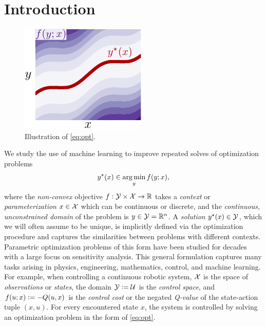 \documentclass[twoside,11pt]{article}
\begin{document}
\section{Introduction}
\begin{figure}
\vspace{-4mm}
\includegraphics[width=\linewidth]{fig/opt.pdf}\vspace{-2mm}
\caption{Illustration of \cref{eq:opt}.}
\vspace{-2mm}
\end{figure}
We study the use of machine learning
to improve repeated solves of optimization problems
\begin{equation}
  y^\star(x) \in \operatorname*{arg\,min}_y f(y; x),
  \label{eq:opt}
\end{equation}
where the \emph{non-convex} objective
$f: {\mathcal{Y}}\times {\mathcal{X}}\rightarrow \mathbb{R}$
takes a \emph{context} or \emph{parameterization}
$x\in{\mathcal{X}}$ which can be continuous or discrete,
and the \emph{continuous, unconstrained domain} of
the problem is $y\in{\mathcal{Y}}=\mathbb{R}^n$.
A \emph{solution} $y^\star(x)\in{\mathcal{Y}}$, which we will often
assume to be unique, is implicitly defined via
the optimization procedure and captures the similarities
between problems with different contexts.
Parametric optimization problems of this form
have been studied for decades
\citep{bank1982non,fiacco1990sensitivity,shapiro2003sensitivity,klatte2006nonsmooth,bonnans2013perturbation,still2018lectures,fiacco2020mathematical}
with a large focus on sensitivity analysis.
This general formulation captures many
tasks arising in physics, engineering, mathematics, control,
and machine learning.
For example, when controlling a continuous robotic system,
${\mathcal{X}}$ is the space of \emph{observations} or \emph{states},
the domain ${\mathcal{Y}}\vcentcolon= {\mathcal{U}}$ is the \emph{control space},
and $f(u; x)\vcentcolon= -Q(u, x)$ is the \emph{control cost}
or the negated \emph{Q-value} of the state-action tuple $(x,u)$.
For every encountered state $x$, the system is controlled
by solving an optimization problem in the form of \cref{eq:opt}.
\end{document}
